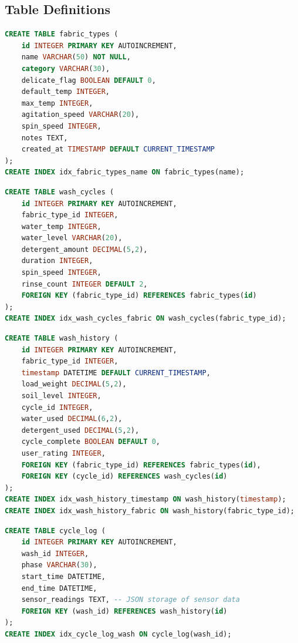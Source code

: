 \subsection{Table Definitions}

\begin{lstlisting}[language=SQL, caption={fabric\_types table}, label={lst:fabric}]
CREATE TABLE fabric_types (
    id INTEGER PRIMARY KEY AUTOINCREMENT,
    name VARCHAR(50) NOT NULL,
    category VARCHAR(30),
    delicate_flag BOOLEAN DEFAULT 0,
    default_temp INTEGER,
    max_temp INTEGER,
    agitation_speed VARCHAR(20),
    spin_speed INTEGER,
    notes TEXT,
    created_at TIMESTAMP DEFAULT CURRENT_TIMESTAMP
);
CREATE INDEX idx_fabric_types_name ON fabric_types(name);
\end{lstlisting}

\begin{lstlisting}[language=SQL, caption={wash\_cycles table}, label={lst:cycles}]
CREATE TABLE wash_cycles (
    id INTEGER PRIMARY KEY AUTOINCREMENT,
    fabric_type_id INTEGER,
    water_temp INTEGER,
    water_level VARCHAR(20),
    detergent_amount DECIMAL(5,2),
    duration INTEGER,
    spin_speed INTEGER,
    rinse_count INTEGER DEFAULT 2,
    FOREIGN KEY (fabric_type_id) REFERENCES fabric_types(id)
);
CREATE INDEX idx_wash_cycles_fabric ON wash_cycles(fabric_type_id);
\end{lstlisting}

\begin{lstlisting}[language=SQL, caption={wash\_history table}, label={lst:history}]
CREATE TABLE wash_history (
    id INTEGER PRIMARY KEY AUTOINCREMENT,
    fabric_type_id INTEGER,
    timestamp DATETIME DEFAULT CURRENT_TIMESTAMP,
    load_weight DECIMAL(5,2),
    soil_level INTEGER,
    cycle_id INTEGER,
    water_used DECIMAL(6,2),
    detergent_used DECIMAL(5,2),
    cycle_complete BOOLEAN DEFAULT 0,
    user_rating INTEGER,
    FOREIGN KEY (fabric_type_id) REFERENCES fabric_types(id),
    FOREIGN KEY (cycle_id) REFERENCES wash_cycles(id)
);
CREATE INDEX idx_wash_history_timestamp ON wash_history(timestamp);
CREATE INDEX idx_wash_history_fabric ON wash_history(fabric_type_id);
\end{lstlisting}

\begin{lstlisting}[language=SQL, caption={cycle\_log table}, label={lst:log}]
CREATE TABLE cycle_log (
    id INTEGER PRIMARY KEY AUTOINCREMENT,
    wash_id INTEGER,
    phase VARCHAR(30),
    start_time DATETIME,
    end_time DATETIME,
    sensor_readings TEXT, -- JSON storage of sensor data
    FOREIGN KEY (wash_id) REFERENCES wash_history(id)
);
CREATE INDEX idx_cycle_log_wash ON cycle_log(wash_id);
\end{lstlisting}

